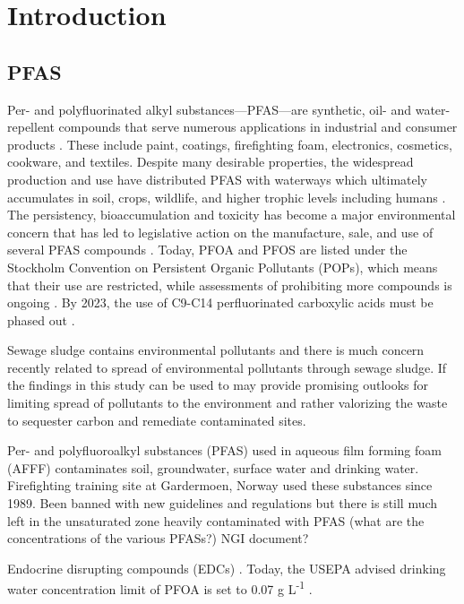 \chapter{Introduction}\label{chap:intro}

\section{PFAS}
Per- and polyfluorinated alkyl substances---PFAS---are synthetic, oil- and water-repellent compounds that serve numerous applications in industrial and consumer products \citep{Nicole2013}. These include paint, coatings, firefighting foam, electronics, cosmetics, cookware, and textiles. Despite many desirable properties, the widespread production and use have distributed PFAS with waterways which ultimately accumulates in soil, crops, wildlife, and higher trophic levels including humans \citep{bhhatarai2011}. The persistency, bioaccumulation and toxicity has become a major environmental concern that has led to legislative action on the manufacture, sale, and use of several PFAS compounds \citep{EPA2014,ECHA2020,EC2020PFAS}. Today, PFOA and PFOS are listed under the Stockholm Convention on Persistent Organic Pollutants (POPs), which means that their use are restricted, while assessments of prohibiting more compounds is ongoing \citep{EC2020PFAS}. By 2023, the use of C9-C14 perfluorinated carboxylic acids must be phased out \citep{ECHA2020}.

Sewage sludge contains environmental pollutants and there is much concern recently related to spread of environmental pollutants through sewage sludge. If the findings in this study can be used to may provide promising outlooks for limiting spread of pollutants to the environment and rather valorizing the waste to sequester carbon and remediate contaminated sites.

Per- and polyfluoroalkyl substances (PFAS) used in aqueous film forming foam (AFFF) contaminates soil, groundwater, surface water and drinking water. Firefighting training site at Gardermoen, Norway used these substances since 1989. Been banned with new guidelines and regulations but there is still much left in the unsaturated zone heavily contaminated with PFAS (what are the concentrations of the various PFASs?) NGI document? 

Endocrine disrupting compounds (EDCs)
. Today, the USEPA advised drinking water concentration limit of PFOA is set to 0.07 \textmu g L\textsuperscript{-1} \citep{us2016drinking}. 


